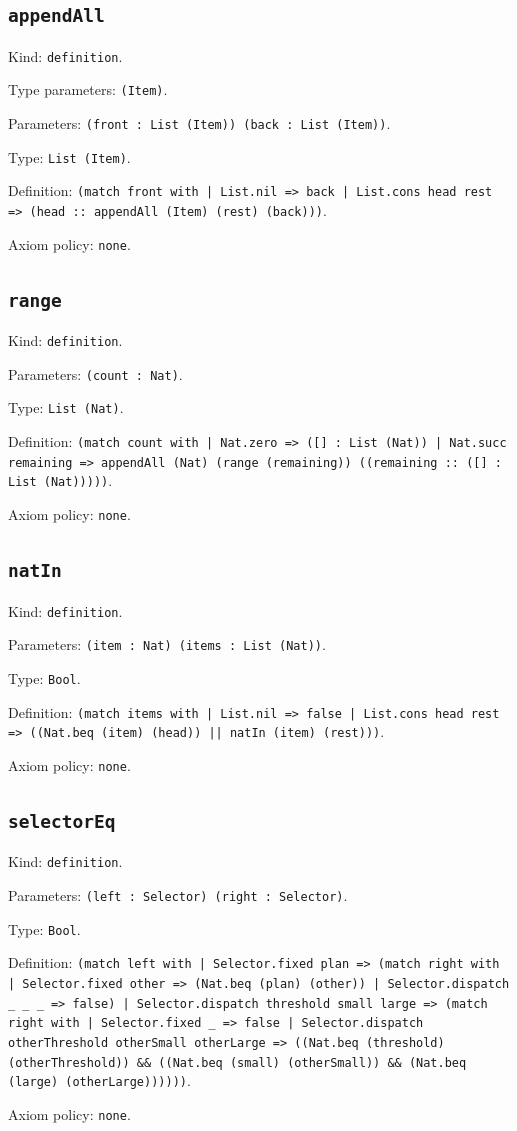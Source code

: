 \documentclass[11pt]{article}
\begin{document}
\subsection*{\texttt{appendAll}}
\noindent Kind: \texttt{definition}.\par
\noindent Type parameters: \texttt{(Item)}.\par
\noindent Parameters: \texttt{(front : List (Item)) (back : List (Item))}.\par
\noindent Type: \texttt{List (Item)}.\par
\noindent Definition: \texttt{(match front with | List.nil => back | List.cons head rest => (head :: appendAll (Item) (rest) (back)))}.\par
\noindent Axiom policy: \texttt{none}.\par
\subsection*{\texttt{range}}
\noindent Kind: \texttt{definition}.\par
\noindent Parameters: \texttt{(count : Nat)}.\par
\noindent Type: \texttt{List (Nat)}.\par
\noindent Definition: \texttt{(match count with | Nat.zero => ([] : List (Nat)) | Nat.succ remaining => appendAll (Nat) (range (remaining)) ((remaining :: ([] : List (Nat)))))}.\par
\noindent Axiom policy: \texttt{none}.\par
\subsection*{\texttt{natIn}}
\noindent Kind: \texttt{definition}.\par
\noindent Parameters: \texttt{(item : Nat) (items : List (Nat))}.\par
\noindent Type: \texttt{Bool}.\par
\noindent Definition: \texttt{(match items with | List.nil => false | List.cons head rest => ((Nat.beq (item) (head)) || natIn (item) (rest)))}.\par
\noindent Axiom policy: \texttt{none}.\par
\subsection*{\texttt{selectorEq}}
\noindent Kind: \texttt{definition}.\par
\noindent Parameters: \texttt{(left : Selector) (right : Selector)}.\par
\noindent Type: \texttt{Bool}.\par
\noindent Definition: \texttt{(match left with | Selector.fixed plan => (match right with | Selector.fixed other => (Nat.beq (plan) (other)) | Selector.dispatch \_ \_ \_ => false) | Selector.dispatch threshold small large => (match right with | Selector.fixed \_ => false | Selector.dispatch otherThreshold otherSmall otherLarge => ((Nat.beq (threshold) (otherThreshold)) \&\& ((Nat.beq (small) (otherSmall)) \&\& (Nat.beq (large) (otherLarge))))))}.\par
\noindent Axiom policy: \texttt{none}.\par
\end{document}
